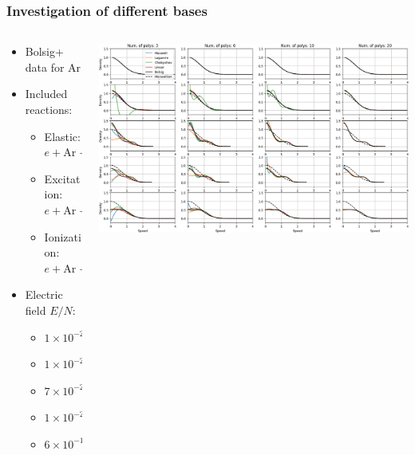 \documentclass[mathserif, aspectratio=169]{beamer}
\begin{document}
\begin{frame}
\frametitle{Investigation of different bases}
%
\begin{columns}[T]
\begin{column}{0.3\linewidth}
\begin{itemize}
\item Bolsig+ \cite{?} data for Ar 
\item Included reactions:
\hspace{-0.5in}
\begin{itemize}
\item Elastic: $e + \text{Ar} \rightarrow e + \text{Ar}$
\item Excitation: $e + \text{Ar} \rightarrow e + \text{Ar}^*$
\item Ionization: $e + \text{Ar} \rightarrow e + \text{Ar}^+ + e$
\end{itemize}
\item Electric field $E/N$:
\begin{itemize}
\item $1\times 10^{-26}\, \text{V} \cdot \text{m}^2$
\item $1\times 10^{-24}\, \text{V} \cdot \text{m}^2$
\item $7\times 10^{-24}\, \text{V} \cdot \text{m}^2$
\item $1\times 10^{-23}\, \text{V} \cdot \text{m}^2$
\item $6\times 10^{-19}\, \text{V} \cdot \text{m}^2$
\end{itemize}
\end{itemize}
\end{column}
\begin{column}{0.7\linewidth}
  \vspace{-0.35in}
  \begin{center}
   \includegraphics[width=\textwidth]{figures/bolsig_visual_lin.png}
  \end{center}
\end{column}
\end{columns}
%
\end{frame}
\end{document}
